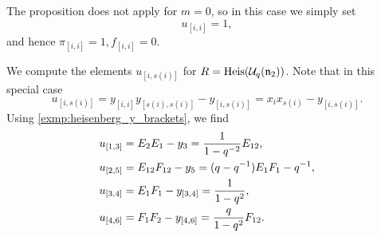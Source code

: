 The proposition does not apply for $m = 0$, so in this case we simply set
\begin{equation*}
	u_{[i, i]} = 1,
\end{equation*}
and hence $\pi_{[i,i]} = 1, f_{[i,i]} = 0$.

\begin{example}\label{exmp:heisenberg_u_bracket}

	We compute the elements $u_{[i, s(i)]}$ for $R = \operatorname{Heis}(\mathcal{U}_q(\mathfrak{n}_2))$. Note that in this special
	case
	\begin{equation*}
		u_{[i, s(i)]} = y_{[i, i]}y_{[s(i), s(i)]} - y_{[i, s(i)]} = x_i x_{s(i)} - y_{[i, s(i)]}.
	\end{equation*}
	Using \cref{exmp:heisenberg_y_brackets}, we find
	\begin{align*}
		 & u_{[1,3]} = E_2 E_1 - y_3 = \frac{1}{1-q^{-2}}E_{12},        \\
		 & u_{[2,5]} = E_{12}F_{12} - y_5 = (q - q^{-1})E_1F_1 - q^{-1}, \\
		 & u_{[3,4]} = E_1 F_1 - y_{[3,4]} = \frac{1}{1-q^2},           \\
		 & u_{[4,6]} = F_1 F_2 - y_{[4,6]} = \frac{q}{1-q^2}F_{12}.
	\end{align*}
\end{example}

